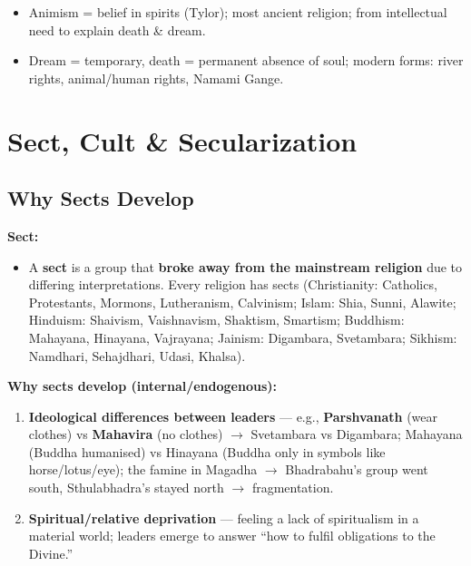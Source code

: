 \begin{QuickRevision}
\begin{itemize}
\item Animism = belief in spirits (Tylor); most ancient religion; from intellectual need to explain death \& dream.
\item Dream = temporary, death = permanent absence of soul; modern forms: river rights, animal/human rights, Namami Gange.
\end{itemize}
\end{QuickRevision}

\sectiondivider

\section{Sect, Cult \& Secularization}

\subsection{Why Sects Develop}

\begin{KeyConcept}
\textbf{Sect:}
\begin{itemize}
\item A \textbf{sect} is a group that \textbf{broke away from the mainstream religion} due to differing interpretations. Every religion has sects (Christianity: Catholics, Protestants, Mormons, Lutheranism, Calvinism; Islam: Shia, Sunni, Alawite; Hinduism: Shaivism, Vaishnavism, Shaktism, Smartism; Buddhism: Mahayana, Hinayana, Vajrayana; Jainism: Digambara, Svetambara; Sikhism: Namdhari, Sehajdhari, Udasi, Khalsa).
\end{itemize}
\end{KeyConcept}

\begin{DataFact}
\textbf{Why sects develop (internal/endogenous):}
\begin{enumerate}
\item \textbf{Ideological differences between leaders} --- e.g., \textbf{Parshvanath} (wear clothes) vs \textbf{Mahavira} (no clothes) $\rightarrow$ Svetambara vs Digambara; Mahayana (Buddha humanised) vs Hinayana (Buddha only in symbols like horse/lotus/eye); the famine in Magadha $\rightarrow$ Bhadrabahu's group went south, Sthulabhadra's stayed north $\rightarrow$ fragmentation.
\item \textbf{Spiritual/relative deprivation} --- feeling a lack of spiritualism in a material world; leaders emerge to answer ``how to fulfil obligations to the Divine.''
\end{enumerate}
\end{DataFact}

